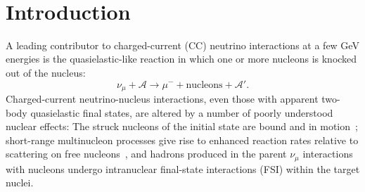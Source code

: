 \documentclass[aps,prl,twocolumn,showpacs,superscriptaddress, floatfix,10pt]{revtex4-2}
\newcommand{\minerva}{MINERvA}
\begin{document}
\collaboration{The \minerva\ Collaboration}\ \noaffiliation
\date{\today}

\begin{abstract}
Neutrino charged-current quasielastic-like scattering, a reaction category extensively used in neutrino oscillation measurements, receives contributions from single nucleon knockout processes, multinucleon processes, and inelastic scattering with subsequent rescattering or absorption in the nucleus to produce only nucleons in the final state.   In this article, comparisons are presented of the same measurement in two different wideband neutrino beams:  one beam peaks near 3~GeV with few neutrinos above 6~GeV;  the other peaks near 6~GeV with few neutrinos above 10~GeV.    Comparisons of differential cross sections in muon and proton kinematics for these two exposures probe deviations from free-neutron scattering that arise from the processes involving the nuclear medium, and provide a test of neutrino interaction models used to infer neutrino energies in oscillation experiments.  Discrepancies are observed between the data and predictions that point to overestimates of the final state interactions of both protons and charged pions in quasielastic-like events. 


\end{abstract}
\maketitle

\section{Introduction}
A leading contributor to charged-current (CC) neutrino interactions at a few GeV energies is the quasielastic-like reaction in which one or more nucleons is knocked out of the nucleus: 
\begin{equation}
\label{signal-channel}
\nu_{\mu}+\mathcal{A}\rightarrow\mu^{-}+\textrm{nucleons} + \mathcal{A'.}
\label{eqn:qelike-reaction}
\end{equation}
\noindent
Charged-current neutrino-nucleus interactions, even those with apparent two-body quasielastic final states, are altered by a number of poorly understood nuclear effects: The struck nucleons of the initial state are bound and in motion~\cite{Moniz:1971mt,Benhar:1994hw}; short-range multinucleon processes give rise to enhanced reaction rates relative to scattering on free nucleons~\cite{Marteau:1999kt,Martini:2010ex,Nieves:2011pp,Gran:2013kda,Fiorentini:2013ezn,Rodrigues:2015hik}, and hadrons produced in the parent $\nu_{\mu}$ interactions with nucleons undergo intranuclear final-state interactions (FSI) within the target nuclei.  
\end{document}
